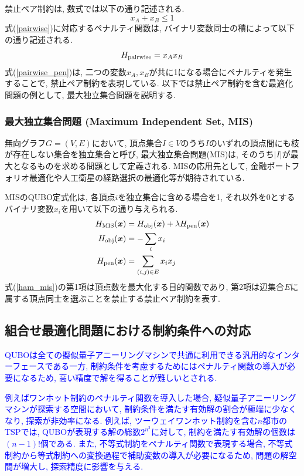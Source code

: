 \documentclass[submit,techrep,noauthor]{ipsj}
\begin{document}
禁止ペア制約は, 数式では以下の通り記述される.
\begin{equation}
x_{A}+x_{B} \le 1 \label{pairwise}
\end{equation}
式(\ref{pairwise})に対応するペナルティ関数は, バイナリ変数同士の積によって以下の通り記述される.
\begin{equation}
H_{{\rm pairwise}}=x_{A}x_{B} \label{pairwise_pen}
\end{equation}
式(\ref{pairwise_pen})は, 二つの変数$x_{A}, x_{B}$が共に1になる場合にペナルティを発生することで, 禁止ペア制約を表現している. 以下では禁止ペア制約を含む最適化問題の例として, 最大独立集合問題を説明する.

\subsubsection{最大独立集合問題 (Maximum Independent Set, MIS)}
無向グラフ$G=(V, E)$において, 頂点集合$I\in V$のうち$I$のいずれの頂点間にも枝が存在しない集合を独立集合と呼び, 最大独立集合問題(MIS)は, そのうち$|I|$が最大となるものを求める問題として定義される. MISの応用先として, 金融ポートフォリオ最適化や人工衛星の経路選択の最適化等が期待されている.

MISのQUBO定式化は, 各頂点$i$を独立集合に含める場合を1, それ以外を0とするバイナリ変数$x_{i}$を用いて以下の通り与えられる.
\textcolor{blue}{
\begin{align}
H_{\rm{MIS}}(\bm{x}) &= H_{\rm{obj}}(\bm{x}) + \lambda H_{\rm{pen}}(\bm{x})\nonumber\\
H_{\rm{obj}}(\bm{x}) &= -\sum_{i}x_{i}\nonumber\\
H_{\rm{pen}}(\bm{x}) &= \sum_{(i,j)\in E }x_{i}x_{j}
\label{ham_mis}
\end{align}
}
式(\ref{ham_mis})の第1項は頂点数を最大化する目的関数であり, 第2項は辺集合$E$に属する頂点同士を選ぶことを禁止する禁止ペア制約を表す.

\subsection{組合せ最適化問題における制約条件への対応}
\textcolor{blue}{QUBOは全ての擬似量子アニーリングマシンで共通に利用できる汎用的なインターフェースである一方, 制約条件を考慮するためにはペナルティ関数の導入が必要になるため, 高い精度で解を得ることが難しいとされる. }

\textcolor{blue}{例えばワンホット制約のペナルティ関数を導入した場合, 疑似量子アニーリングマシンが探索する空間において, 制約条件を満たす有効解の割合が極端に少なくなり, 探索が非効率になる. 例えば, ツーウェイワンホット制約を含む$n$都市のTSPでは, QUBOが表現する解の総数$2^{n^{2}}$に対して, 制約を満たす有効解の個数は$(n-1)!$個である. また, 不等式制約をペナルティ関数で表現する場合, 不等式制約から等式制約への変換過程で補助変数の導入が必要になるため, 問題の解空間が増大し, 探索精度に影響を与える.}
\end{document}
